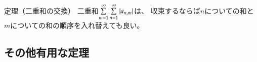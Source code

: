 \documentclass[11pt,b5paper,papersize,dvipdfmx]{jsbook}
\begin{document}
\begin{thm}{定理（二重和の交換）}
  二重和$\sum\limits_{m=1}^\infty \sum\limits_{n=1}^\infty |a_{n,m}|$は、
  収束するならば$n$についての和と$m$についての和の順序を入れ替えても良い。
\end{thm}


\subsection{その他有用な定理}
\end{document}
